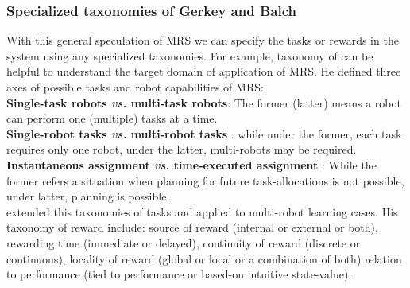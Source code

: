 \subsubsection*{Specialized taxonomies of Gerkey and Balch} 
With this general speculation of MRS we can specify the tasks or rewards in the system using any specialized taxonomies. For example, taxonomy of  can be helpful to understand the target domain of application of MRS. He defined three axes of possible tasks and robot capabilities of MRS:\\
\textbf{Single-task robots  {\em vs.} multi-task robots}: The former (latter) means a robot can perform one (multiple) tasks at a time.\\
\textbf{Single-robot tasks  {\em vs.} multi-robot tasks }: while under the former, each task requires only one robot, under the latter, multi-robots may be required.\\
\textbf{Instantaneous assignment {\em vs.} time-executed assignment }: While the former refers a situation when planning for future task-allocations is not possible, under latter, planning is possible.\\
 extended this taxonomies of tasks and applied to multi-robot learning cases. His taxonomy of reward include: source of reward (internal or external or both), rewarding time (immediate or delayed), continuity of reward (discrete or continuous), locality of reward (global or local or a combination of both) relation to performance (tied to performance or based-on intuitive state-value).

